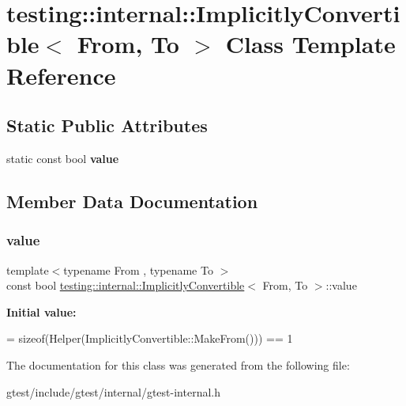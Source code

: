 \hypertarget{classtesting_1_1internal_1_1ImplicitlyConvertible}{}\section{testing\+:\+:internal\+:\+:Implicitly\+Convertible$<$ From, To $>$ Class Template Reference}
\label{classtesting_1_1internal_1_1ImplicitlyConvertible}
\subsection*{Static Public Attributes}
\begin{DoxyCompactItemize}
\item 
static const bool {\bfseries value}
\end{DoxyCompactItemize}


\subsection{Member Data Documentation}
\mbox{\label{classtesting_1_1internal_1_1ImplicitlyConvertible_aea51cecabca681fb75659e224771b7b7}} 
\subsubsection{\texorpdfstring{value}{value}}
{\footnotesize\ttfamily template$<$typename From , typename To $>$ \\
const bool \hyperlink{classtesting_1_1internal_1_1ImplicitlyConvertible}{testing\+::internal\+::\+Implicitly\+Convertible}$<$ From, To $>$\+::value\hspace{0.3cm}{\ttfamily [static]}}

{\bfseries Initial value\+:}
\begin{DoxyCode}
=
      \textcolor{keyword}{sizeof}(Helper(ImplicitlyConvertible::MakeFrom())) == 1
\end{DoxyCode}


The documentation for this class was generated from the following file\+:\begin{DoxyCompactItemize}
\item 
gtest/include/gtest/internal/gtest-\/internal.\+h\end{DoxyCompactItemize}

